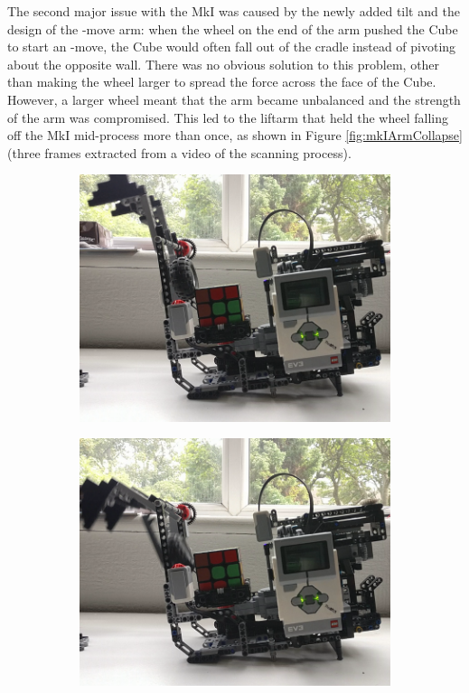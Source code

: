 \documentclass{report}
\newcommand{\move}[1]{\uppercase{\texttt{\formatmovesnospace{#1}}}-move}
\begin{document}
	The second major issue with the MkI was caused by the newly added tilt and the design of the \move{x} arm: when the wheel on the end of the arm pushed the Cube to start an \move{x}, the Cube would often fall out of the cradle instead of pivoting about the opposite wall. There was no obvious solution to this problem, other than making the wheel larger to spread the force across the face of the Cube. However, a larger wheel meant that the arm became unbalanced and the strength of the arm was compromised. This led to the liftarm that held the wheel falling off the MkI mid-process more than once, as shown in Figure \ref{fig:mkIArmCollapse} (three frames extracted from a video of the scanning process).

	\begin{figure}[H]
		\centering
		\begin{subfigure}[b]{0.25\textwidth}
			\includegraphics[width=\textwidth]{Resources/Images/imgMkIArmCollapse1.png}
		\end{subfigure}
		\hspace{5mm}
		\begin{subfigure}[b]{0.25\textwidth}
			\includegraphics[width=\textwidth]{Resources/Images/imgMkIArmCollapse2.png}

\end{subfigure}
\end{figure}
\end{document}
